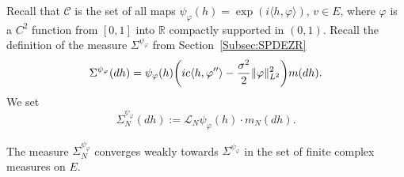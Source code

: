 \documentclass[10pt]{amsart}
\theoremstyle{definition}\newtheorem{defi}[theo]{Definition}\newtheorem{rema}[theo]{Remark}\newtheorem{exam}[theo]{Example}\newtheorem{exem}[theo]{Example}\newtheorem{nota}[theo]{Notation}
\theoremstyle{plain}
\newcommand{\cC}{\mathcal{C}}
\newcommand{\cL}{\mathcal{L}}
\newcommand{\R}{\mathbb{R}}
\let\originalleft\left
\let\originalright\right
\renewcommand{\left}{\mathopen{}\mathclose\bgroup\originalleft}
\renewcommand{\right}{\aftergroup\egroup\originalright}
\begin{document}
Recall that $\cC$ is the set of all maps $\psi_\varphi(h) = \exp(i \langle h,\varphi \rangle)$, $v\in E$, where $\varphi$ is a $C^2$ function from $[0,1]$ into $\R$ compactly supported in $(0,1)$. Recall the definition of the measure $\Sigma^{\psi_\varphi}$ from Section~\ref{Subsec:SPDEZR}
\begin{equation*}
\Sigma^{\psi_\varphi}(dh) = \psi_\varphi(h)\left(ic \langle h,\varphi''\rangle -\frac{\sigma^2}{2} \| \varphi\|_{L^2}^2 \right) m(dh).
\end{equation*}
We set
\[
\Sigma_N^{\psi_\varphi}(dh) := \cL_N \psi_\varphi(h)\cdot m_N(dh).
\]

\begin{prop}\label{Prop:DiscreteIbPF}
The measure $\Sigma_N^{\psi_\varphi}$ converges weakly towards $\Sigma^{\psi_\varphi}$ in the set of finite complex measures on $E$.
\end{prop}
\end{document}

